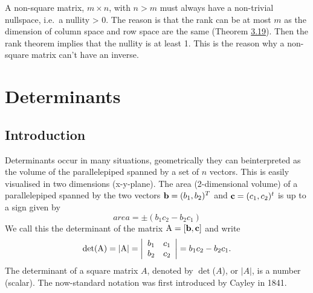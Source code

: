 \documentclass[
  a4paper,
  DIV=11,
  numbers=noendperiod,
  oneside]{scrreprt}
\theoremstyle{definition}
\theoremstyle{remark}
\newcounter{quartocalloutnteno}
\newcommand{\quartocalloutnte}[1]{\refstepcounter{quartocalloutnteno}\label{#1}}
\begin{document}
\begin{tcolorbox}[enhanced jigsaw, opacitybacktitle=0.6, left=2mm, breakable, bottomrule=.15mm, colbacktitle=quarto-callout-note-color!10!white, leftrule=.75mm, titlerule=0mm, rightrule=.15mm, toprule=.15mm, colback=white, toptitle=1mm, colframe=quarto-callout-note-color-frame, coltitle=black, bottomtitle=1mm, title=\textcolor{quarto-callout-note-color}{\faInfo}\hspace{0.5em}{Note \ref*{nte-nonsquare}: Remark: Nullspace of non-square matrices}, opacityback=0, arc=.35mm]

\quartocalloutnte{nte-nonsquare} 

A non-square matrix, \(m \times n\), with \(n>m\) must always have a
non-trivial nullspace, i.e.~a nullity \textgreater{} 0. The reason is
that the rank can be at most \(m\) as the dimension of column space and
row space are the same (Theorem \hyperref[rowcolumnspace]{3.19}). Then
the rank theorem implies that the nullity is at least 1. This is the
reason why a non-square matrix can't have an inverse.

\end{tcolorbox}

\chapter{Determinants}\label{determinants}

\section{Introduction}\label{introduction-1}

Determinants occur in many situations, geometrically they can
beinterpreted as the volume of the parallelepiped spanned by a set of
\(n\) vectors. This is easily visualised in two dimensions (x-y-plane).
The area (2-dimensional volume) of a parallelepiped spanned by the two
vectors \({\bf b}=(b_{1},b_{2})^{T}\) and \({\bf c}=(c_{1},c_{2})^{t}\)
is up to a sign given by \[area = \pm(b_{1}c_{2}- b_{2} c_{1} )\] We
call this the determinant of the matrix \({\rm A} = [{\bf b},{\bf c}]\)
and write \[{\rm det(A)}= |{\rm A}|=\left| 
\begin{array}{cc}
b_{1} & c_{1} \\ 
b_{2} & c_{2}
\end{array}
\right| = b_{1}c_{2}- b_{2} c_{1} .\] The determinant of a square matrix
\(A\), denoted by \(\det\)(\(A\)), or \(\left|
A\right|\), is a number (scalar). The now-standard notation was first
introduced by Cayley in 1841.
\end{document}
